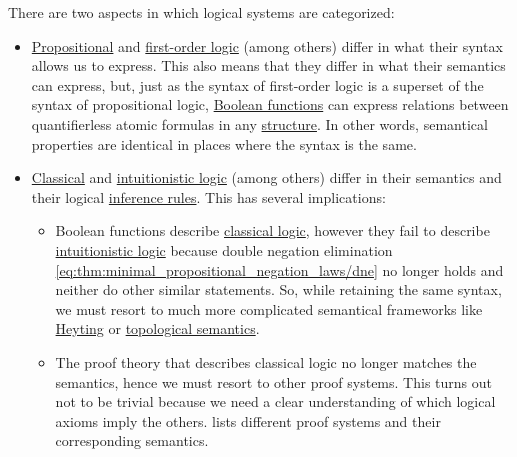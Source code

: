 There are two aspects in which logical systems are categorized:
\begin{itemize}
  \item \hyperref[subsec:propositional_logic]{Propositional} and \hyperref[subsec:first_order_logic]{first-order logic} (among others) differ in what their syntax allows us to express. This also means that they differ in what their semantics can express, but, just as the syntax of first-order logic is a superset of the syntax of propositional logic, \hyperref[subsec:boolean_functions]{Boolean functions} can express relations between quantifierless atomic formulas in any \hyperref[def:first_order_structure]{structure}. In other words, semantical properties are identical in places where the syntax is the same.

  \item \hyperref[rem:classical_logic]{Classical} and \hyperref[rem:intuitionistic_logic]{intuitionistic logic} (among others) differ in their semantics and their logical \hyperref[def:judgment/inference_rule]{inference rules}. This has several implications:
  \begin{itemize}
     \item Boolean functions describe \hyperref[rem:classical_logic]{classical logic}, however they fail to describe \hyperref[rem:intuitionistic_logic]{intuitionistic logic} because double negation elimination \eqref{eq:thm:minimal_propositional_negation_laws/dne} no longer holds and neither do other similar statements. So, while retaining the same syntax, we must resort to much more complicated semantical frameworks like \hyperref[def:propositional_heyting_algebra_semantics]{Heyting} or \hyperref[def:propositional_topological_semantics]{topological semantics}.

     \item The proof theory that describes classical logic no longer matches the semantics, hence we must resort to other proof systems. This turns out not to be trivial because we need a clear understanding of which logical axioms imply the others.  lists different proof systems and their corresponding semantics.
  \end{itemize}
\end{itemize}

